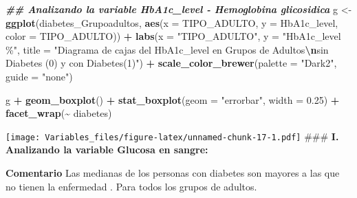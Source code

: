 \documentclass[
]{article}
\newenvironment{Shaded}{\begin{snugshade}}{\end{snugshade}}
\newcommand{\AttributeTok}[1]{\textcolor[rgb]{0.13,0.29,0.53}{#1}}
\newcommand{\DocumentationTok}[1]{\textcolor[rgb]{0.56,0.35,0.01}{\textbf{\textit{#1}}}}
\newcommand{\FloatTok}[1]{\textcolor[rgb]{0.00,0.00,0.81}{#1}}
\newcommand{\FunctionTok}[1]{\textcolor[rgb]{0.13,0.29,0.53}{\textbf{#1}}}
\newcommand{\NormalTok}[1]{#1}
\newcommand{\OtherTok}[1]{\textcolor[rgb]{0.56,0.35,0.01}{#1}}
\newcommand{\SpecialCharTok}[1]{\textcolor[rgb]{0.81,0.36,0.00}{\textbf{#1}}}
\newcommand{\StringTok}[1]{\textcolor[rgb]{0.31,0.60,0.02}{#1}}
\begin{document}
\begin{Shaded}
\begin{Highlighting}[]
\DocumentationTok{\#\# Analizando la variable  HbA1c\_level  {-} Hemoglobina glicosidica}
\NormalTok{g }\OtherTok{\textless{}{-}}
  \FunctionTok{ggplot}\NormalTok{(diabetes\_Grupoadultos, }\FunctionTok{aes}\NormalTok{(}\AttributeTok{x =}\NormalTok{ TIPO\_ADULTO, }\AttributeTok{y =}\NormalTok{ HbA1c\_level,}
                   \AttributeTok{color =}\NormalTok{ TIPO\_ADULTO)) }\SpecialCharTok{+}
    \FunctionTok{labs}\NormalTok{(}\AttributeTok{x =} \StringTok{"TIPO\_ADULTO"}\NormalTok{, }\AttributeTok{y =} \StringTok{"HbA1c\_level \%"}\NormalTok{, }\AttributeTok{title =} \StringTok{"Diagrama de cajas del HbA1c\_level en Grupos de Adultos}\SpecialCharTok{\textbackslash{}n}\StringTok{sin Diabetes (0) y con Diabetes(1)"}\NormalTok{) }\SpecialCharTok{+}
    \FunctionTok{scale\_color\_brewer}\NormalTok{(}\AttributeTok{palette =} \StringTok{"Dark2"}\NormalTok{, }\AttributeTok{guide =} \StringTok{"none"}\NormalTok{)}

\NormalTok{g }\SpecialCharTok{+} \FunctionTok{geom\_boxplot}\NormalTok{() }\SpecialCharTok{+} \FunctionTok{stat\_boxplot}\NormalTok{(}\AttributeTok{geom =} \StringTok{"errorbar"}\NormalTok{,}
               \AttributeTok{width =} \FloatTok{0.25}\NormalTok{) }\SpecialCharTok{+} \FunctionTok{facet\_wrap}\NormalTok{(}\SpecialCharTok{\textasciitilde{}}\NormalTok{ diabetes)}
\end{Highlighting}
\end{Shaded}

\texttt{[image: Variables\_files/figure-latex/unnamed-chunk-17-1.pdf]}
\#\#\# \textbf{I. Analizando la variable Glucosa en sangre:}

\textbf{Comentario} Las medianas de los personas con diabetes son
mayores a las que no tienen la enfermedad . Para todos los grupos de
adultos.
\end{document}
